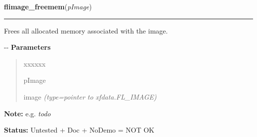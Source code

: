 \hspace{.8\funcindent}\begin{boxedminipage}{\funcwidth}

    \raggedright \textbf{flimage\_freemem}(\textit{pImage})

    \vspace{-1.5ex}

    \rule{\textwidth}{0.5\fboxrule}
\setlength{\parskip}{2ex}

Frees all allocated memory associated with the image.

-{}-
\setlength{\parskip}{1ex}
      \textbf{Parameters}
      \vspace{-1ex}

      \begin{quote}
        \begin{Ventry}{xxxxxx}

          \item[pImage]


image
            {\it (type=pointer to xfdata.FL\_IMAGE)}

        \end{Ventry}

      \end{quote}

\textbf{Note:} 
e.g. \emph{todo}


\textbf{Status:} 
Untested + Doc + NoDemo = NOT OK


    \end{boxedminipage}

    \label{xformslib:flflimage:flimage_get_closest_color_from_map}

    \vspace{0.5ex}

